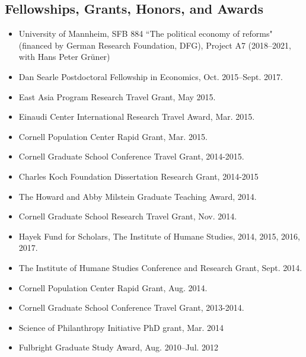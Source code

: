 \documentclass[margin, letterpaper]{res}
\begin{document}
\begin{resume}
\section{Fellowships, Grants, Honors, and Awards}
\begin{itemize}
\item University of Mannheim, SFB 884 ``The political economy of reforms" (financed by German Research Foundation, DFG), Project A7 (2018--2021, with Hans Peter Gr{\"u}ner)
\item Dan Searle Postdoctoral Fellowship in Economics, Oct. 2015--Sept. 2017.
\item East Asia Program Research Travel Grant, May 2015.
\item Einaudi Center International Research Travel Award, Mar. 2015.
\item Cornell Population Center Rapid Grant, Mar. 2015.
\item Cornell Graduate School Conference Travel Grant, 2014-2015.
\item Charles Koch Foundation Dissertation Research Grant, 2014-2015
\item The Howard and Abby Milstein Graduate Teaching Award, 2014.
\item Cornell Graduate School Research Travel Grant, Nov. 2014.
\item Hayek Fund for Scholars, The Institute of Humane Studies, 2014, 2015, 2016, 2017.
\item The Institute of Humane Studies Conference and Research Grant, Sept. 2014.
\item Cornell Population Center Rapid Grant, Aug. 2014.
\item Cornell Graduate School Conference Travel Grant, 2013-2014.
\item Science of Philanthropy Initiative PhD grant, Mar. 2014
\item Fulbright Graduate Study Award, Aug. 2010--Jul. 2012
\end{itemize}


\end{resume}
\end{document}
